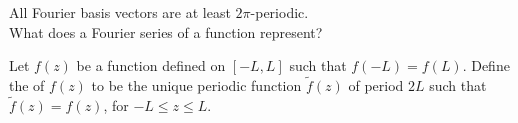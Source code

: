 \documentclass[class=article,crop=false]{standalone}
\begin{document}
All Fourier basis vectors are at least $2\pi$-periodic.
\\
What does a Fourier series of a function represent?
\begin{defn}
	Let $f(z)$ be a function defined on $[-L,L]$ such that  $ f(-L) = f(L)$. Define the   of $f(z)$ to be the unique periodic function  $\tilde{f}(z)$ of period $2L$ such that  $\tilde{f}(z) = f(z)$, for  $-L\leq z \leq L$.
\end{defn}
\end{document}
